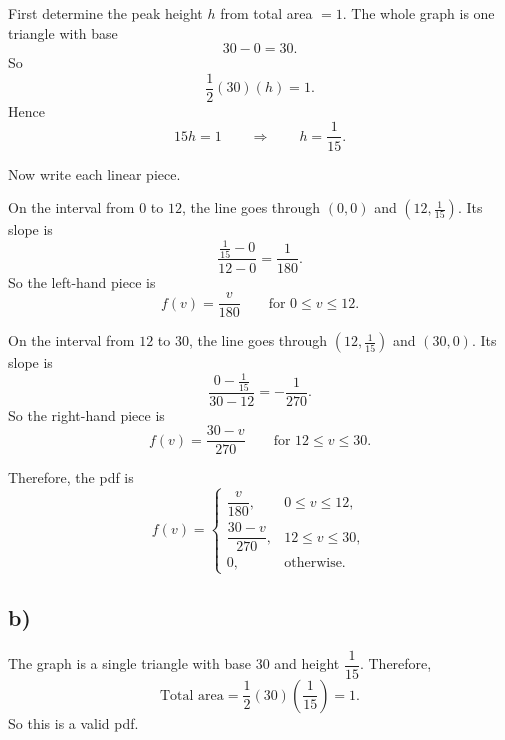 First determine the peak height $h$ from total area $=1$. The whole graph is one triangle with base
\[
30-0=30.
\]
So
\[
\frac12(30)(h)=1.
\]
Hence
\[
15h=1
\qquad \Rightarrow \qquad
h=\frac{1}{15}.
\]

Now write each linear piece.

On the interval from $0$ to $12$, the line goes through $(0,0)$ and $(12,\tfrac{1}{15})$. Its slope is
\[
\frac{\tfrac{1}{15}-0}{12-0}=\frac{1}{180}.
\]
So the left-hand piece is
\[
f(v)=\frac{v}{180}\qquad \text{for }0\le v\le 12.
\]

On the interval from $12$ to $30$, the line goes through $(12,\tfrac{1}{15})$ and $(30,0)$. Its slope is
\[
\frac{0-\tfrac{1}{15}}{30-12}=-\frac{1}{270}.
\]
So the right-hand piece is
\[
f(v)=\frac{30-v}{270}\qquad \text{for }12\le v\le 30.
\]

Therefore, the pdf is
\[
f(v)=
\begin{cases}
	\dfrac{v}{180}, & 0\le v\le 12,\\[6pt]
	\dfrac{30-v}{270}, & 12\le v\le 30,\\[6pt]
	0, & \text{otherwise.}
\end{cases}
\]

\subsection*{b)}
The graph is a single triangle with base $30$ and height $\dfrac{1}{15}$. Therefore,
\[
\text{Total area}=\frac12(30)\left(\frac{1}{15}\right)=1.
\]
So this is a valid pdf.


